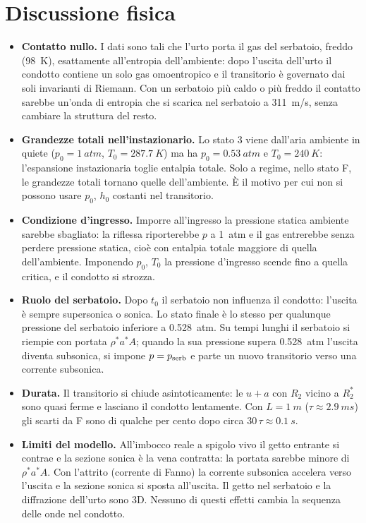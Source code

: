 \documentclass[11pt,a4paper]{article}
\newcommand{\upa}{u+a}
\begin{document}
\section{Discussione fisica}
\begin{itemize}
\item \textbf{Contatto nullo.} I dati sono tali che l'urto porta il gas del serbatoio, freddo (\SI{98}{K}),
  esattamente all'entropia dell'ambiente: dopo l'uscita dell'urto il condotto contiene un solo gas omoentropico e il
  transitorio è governato dai soli invarianti di Riemann. Con un serbatoio più caldo o più freddo il contatto
  sarebbe un'onda di entropia che si scarica nel serbatoio a \SI{311}{m/s}, senza cambiare la struttura del resto.
\item \textbf{Grandezze totali nell'instazionario.} Lo stato 3 viene dall'aria ambiente in quiete
  ($p_0=\SI{1}{atm}$, $T_0=\SI{287.7}{K}$) ma ha $p_0=\SI{0.53}{atm}$ e $T_0=\SI{240}{K}$: l'espansione
  instazionaria toglie entalpia totale. Solo a regime, nello stato F, le grandezze totali tornano quelle
  dell'ambiente. È il motivo per cui non si possono usare $p_0$, $h_0$ costanti nel transitorio.
\item \textbf{Condizione d'ingresso.} Imporre all'ingresso la pressione statica ambiente sarebbe sbagliato: la
  riflessa riporterebbe $p$ a \SI{1}{atm} e il gas entrerebbe senza perdere pressione statica, cioè con entalpia
  totale maggiore di quella dell'ambiente. Imponendo $p_0$, $T_0$ la pressione d'ingresso scende fino a quella
  critica, e il condotto si strozza.
\item \textbf{Ruolo del serbatoio.} Dopo $t_0$ il serbatoio non influenza il condotto: l'uscita è sempre
  supersonica o sonica. Lo stato finale è lo stesso per qualunque pressione del serbatoio inferiore a
  \SI{0.528}{atm}. Su tempi lunghi il serbatoio si riempie con portata $\rho^*a^*A$; quando la sua pressione supera
  \SI{0.528}{atm} l'uscita diventa subsonica, si impone $p=p_{\rm serb}$ e parte un nuovo transitorio verso una
  corrente subsonica.
\item \textbf{Durata.} Il transitorio si chiude asintoticamente: le $\upa$ con $R_2$ vicino a $R_2^*$ sono quasi
  ferme e lasciano il condotto lentamente. Con $L=\SI{1}{m}$ ($\tau\approx\SI{2.9}{ms}$) gli scarti da F sono di
  qualche per cento dopo circa 30$\,\tau\approx\SI{0.1}{s}$.
\item \textbf{Limiti del modello.} All'imbocco reale a spigolo vivo il getto entrante si contrae e la sezione
  sonica è la vena contratta: la portata sarebbe minore di $\rho^*a^*A$. Con l'attrito (corrente di Fanno) la
  corrente subsonica accelera verso l'uscita e la sezione sonica si sposta all'uscita. Il getto nel serbatoio e la
  diffrazione dell'urto sono 3D. Nessuno di questi effetti cambia la sequenza delle onde nel condotto.
\end{itemize}
\end{document}
